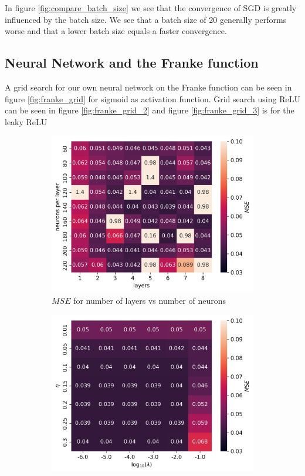 \documentclass[11pt]{article}
\begin{document}
In figure \ref{fig:compare_batch_size} we see that the convergence of SGD is greatly influenced by the batch size. We see that a batch size of 20 generally performs worse and that a lower batch size equals a faster convergence.

\subsection{Neural Network and the Franke function}
A grid search for our own neural network on the Franke function can be seen in figure \ref{fig:franke_grid} for sigmoid as activation function. Grid search using ReLU can be seen in figure \ref{fig:franke_grid_2} and figure \ref{fig:franke_grid_3} is for the leaky ReLU
\begin{figure}[H]
    \begin{subfigure}{.5\textwidth}
        \centering
        \includegraphics[width=\textwidth]{../figures/franke_L_n_test_sigmoid.png}
        \caption{$MSE$ for number of layers vs number of neurons}
        \label{fig:}
    \end{subfigure}
    \begin{subfigure}{.5\textwidth}
        \centering
        \includegraphics[width=\textwidth]{../figures/franke_eta_lmb_sigmoid.png}

\end{subfigure}
\end{figure}
\end{document}

